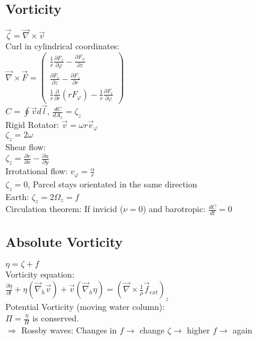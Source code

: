 \subsection*{Vorticity}
$\vec{\zeta}=\vec{\nabla}\times\vec{v}$\\
Curl in cylindrical coordinates:\\
$\vec{\nabla}\times\vec{F}=
\begin{pmatrix}
\frac{1}{r}\frac{\partial F_z}{\partial \varphi}-\frac{\partial F_\varphi}{\partial z}\\
\frac{\partial F_r}{\partial z}-\frac{\partial F_z}{\partial r}\\
\frac{1}{r}\frac{\partial}{\partial r}(rF_\varphi)-\frac{1}{r}\frac{\partial F_r}{\partial \varphi}
\end{pmatrix}$\\
$ C = \oint \vec{v}d\vec{l}$, $\frac{dC}{dA_z}=\zeta_z$\\
Rigid Rotator: $\vec{v}=\omega r\vec{e}_\varphi$\\
$\zeta_z = 2\omega$\\
Shear flow:\\
$\zeta_z = \frac{\partial v}{\partial x}-\frac{\partial u}{\partial y}$\\
Irrotational flow: $v_\varphi=\frac{\alpha}{r}$\\
$\zeta_z=0$, Parcel stays orientated in the same direction\\
Earth: $\zeta_z=2\Omega_z=f$\\
Circulation theorem: If invicid ($\nu=0$) and barotropic: $\frac{dC}{dt}=0$
\subsection*{Absolute Vorticity}
$\eta = \zeta + f$\\
Vorticity equation:\\
$\frac{\partial\eta}{\partial t}+\eta(\vec{\nabla}_h\vec{v})+\vec{v}(\vec{\nabla}_h\eta)=(\vec{\nabla}\times\frac{1}{\rho}\vec{f}_{ext})_z$\\
Potential Vorticity (moving water column):\\
$\Pi=\frac{\eta}{H}$ is conserved.\\
$\Rightarrow$ Rossby waves: Changes in $f \rightarrow$ change $\zeta \rightarrow$ higher $f \rightarrow$ again
